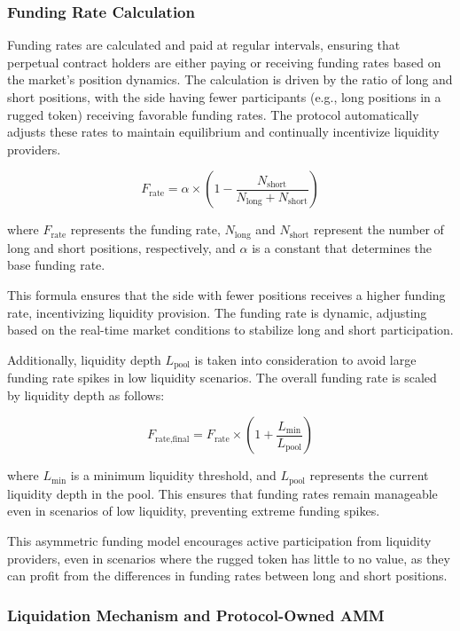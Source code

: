 \documentclass{article}
\begin{document}

\subsubsection{Funding Rate Calculation}

Funding rates are calculated and paid at regular intervals, ensuring that perpetual contract holders are either paying or receiving funding rates based on the market’s position dynamics. The calculation is driven by the ratio of long and short positions, with the side having fewer participants (e.g., long positions in a rugged token) receiving favorable funding rates. The protocol automatically adjusts these rates to maintain equilibrium and continually incentivize liquidity providers.

\[
F_{\text{rate}} = \alpha \times \left( 1 - \frac{N_{\text{short}}}{N_{\text{long}} + N_{\text{short}}} \right)
\]

where \( F_{\text{rate}} \) represents the funding rate, \( N_{\text{long}} \) and \( N_{\text{short}} \) represent the number of long and short positions, respectively, and \( \alpha \) is a constant that determines the base funding rate.

This formula ensures that the side with fewer positions receives a higher funding rate, incentivizing liquidity provision. The funding rate is dynamic, adjusting based on the real-time market conditions to stabilize long and short participation.

Additionally, liquidity depth \( L_{\text{pool}} \) is taken into consideration to avoid large funding rate spikes in low liquidity scenarios. The overall funding rate is scaled by liquidity depth as follows:

\[
F_{\text{rate,final}} = F_{\text{rate}} \times \left( 1 + \frac{L_{\text{min}}}{L_{\text{pool}}} \right)
\]

where \( L_{\text{min}} \) is a minimum liquidity threshold, and \( L_{\text{pool}} \) represents the current liquidity depth in the pool. This ensures that funding rates remain manageable even in scenarios of low liquidity, preventing extreme funding spikes.

This asymmetric funding model encourages active participation from liquidity providers, even in scenarios where the rugged token has little to no value, as they can profit from the differences in funding rates between long and short positions.

\subsubsection{Liquidation Mechanism and Protocol-Owned AMM}
\end{document}
